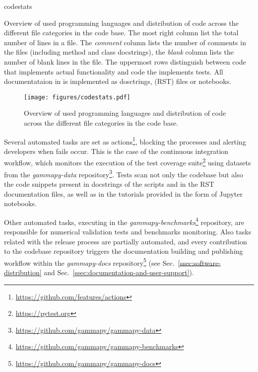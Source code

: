 \documentclass[traditabstract, longauth]{aa}
\begin{document}
\begin{table}
	{codestats}
	\caption{
        Overview of used programming languages and distribution of code across the different file
        categories in the \gammapy code base. The most right column list the total number of lines
        in a file. The \textit{comment} column lists the number of comments in the files
        (including method and class docstrings), the \textit{blank} column lists the
        number of blank lines in the file. The uppermost rows distinguish between
        code that implements actual functionality and code the implements tests.
        All documentataion in \gammapy is implemented as dosctrings,  (RST)
        files or notebooks.
    }
	\label{table:codestats:data}
\end{table}

\begin{figure}[t]
	\centering
	\texttt{[image: figures/codestats.pdf]}
	\caption{
		Overview of used programming languages and distribution of code across the different file
        categories in the \gammapy code base.
    } \label{fig:codestats:lang}
\end{figure}

Several automated tasks are set as \github
actions\footnote{\url{https://github.com/features/actions}}, blocking the
processes and alerting developers when fails occur. This is the case of the
continuous integration workflow, which monitors the execution of the test coverage
suite\footnote{\url{https://pytest.org}} using datasets from the
\textit{gammapy-data} repository\footnote{\url{https://github.com/gammapy/gammapy-data}}. Tests scan not only the codebase but also the
code snippets present in docstrings of the scripts and in the RST documentation
files, as well as in the tutorials provided in the form of Jupyter notebooks.

Other automated tasks, executing in the \textit{gammapy-benchmarks}\footnote{\url{https://github.com/gammapy/gammapy-benchmarks}} repository,
are responsible for numerical validation tests and benchmarks monitoring. Also
tasks related with the release process are partially automated, and every
contribution to the codebase repository triggers the documentation building and
publishing workflow within the \textit{gammapy-docs} repository\footnote{\url{https://github.com/gammapy/gammapy-docs}}
(see Sec.~\ref{ssec:software-distribution} and Sec.~\ref{ssec:documentation-and-user-support}).
\end{document}
